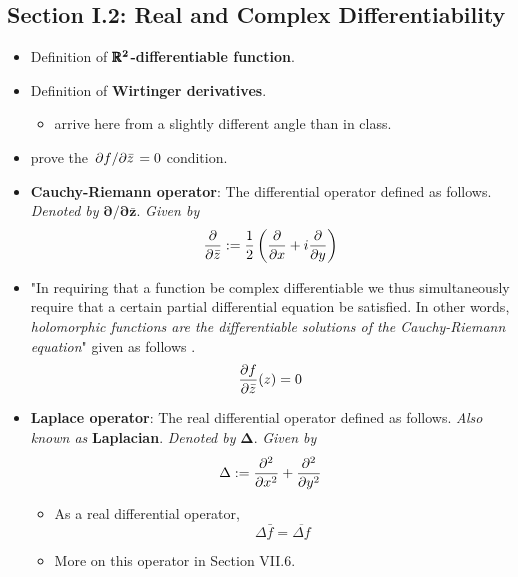 \documentclass[../notes.tex]{subfiles}
\begin{document}
\subsection*{Section I.2: Real and Complex Differentiability}
\begin{itemize}
    \item Definition of \textbf{$\bm{\pmb{\mathbb{R}}^2}$-differentiable function}.
    \item Definition of \textbf{Wirtinger derivatives}.
    \begin{itemize}
        \item \textcite{bib:FischerLieb} arrive here from a slightly different angle than in class.
    \end{itemize}
    \item \textcite{bib:FischerLieb} prove the $\pdv*{f}{\bar{z}}=0$ condition.
    \item \textbf{Cauchy-Riemann operator}: The differential operator defined as follows. \emph{Denoted by} $\bm{\partial/\partial\bar{z}}$. \emph{Given by}
    \begin{equation*}
        \pdv{\bar{z}} := \frac{1}{2}\left( \pdv{x}+i\pdv{y} \right)
    \end{equation*}
    \item "In requiring that a function be complex differentiable we thus simultaneously require
    that a certain partial differential equation be satisfied. In other words, \emph{holomorphic
    functions are the differentiable solutions of the Cauchy-Riemann equation}" given as follows \parencite[9]{bib:FischerLieb}.
    \begin{equation*}
        {\pdv{f}{\bar{z}}}(z) = 0
    \end{equation*}
    \item \textbf{Laplace operator}: The real differential operator defined as follows. \emph{Also known as} \textbf{Laplacian}. \emph{Denoted by} $\bm{\Delta}$. \emph{Given by}
    \begin{equation*}
        \Delta := \pdv[2]{x}+\pdv[2]{y}
    \end{equation*}
    \begin{itemize}
        \item As a real differential operator,
        \begin{equation*}
            \Delta\bar{f} = \overline{\Delta f}
        \end{equation*}
        \item More on this operator in Section VII.6.
    \end{itemize}

\end{itemize}
\end{document}
